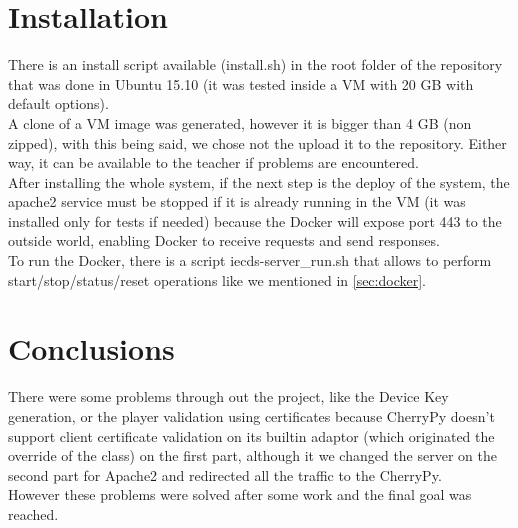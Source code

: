 \documentclass[11pt,a4paper]{report}
\begin{document}
\chapter{Installation}

There is an install script available (install.sh) in the root folder of the repository that was done in Ubuntu 15.10 (it was tested inside a VM with 20 GB with default options).\\

A clone of a VM image was generated, however it is bigger than 4 GB (non zipped), with this being said, we chose not the upload it to the repository. Either way, it can be available to the teacher if problems are encountered.\\

After installing the whole system, if the next step is the deploy of the system, the apache2 service must be stopped if it is already running in the VM (it was installed only for tests if needed) because the Docker will expose port 443 to the outside world, enabling Docker to receive requests and send responses.\\

To run the Docker, there is a script iecds-server\_run.sh that allows to perform start/stop/status/reset operations like we mentioned in \autoref{sec:docker}. 

\chapter{Conclusions}

There were some problems through out the project, like the Device Key generation, or the player validation using certificates because CherryPy doesn't support client certificate validation on its builtin adaptor (which originated the override of the class) on the first part, although it we changed the server on the second part for Apache2 and redirected all the traffic to the CherryPy.\\

However these problems were solved after some work and the final goal was reached. 





\listoffigures
{}
\end{document}
